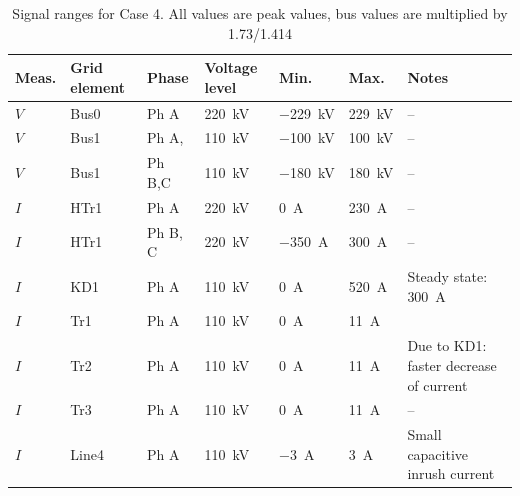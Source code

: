 
\begin{table}[htbp]
  \centering
  \caption{Signal ranges for Case 4. All values are peak values, bus values are multiplied by 1.73/1.414}
  \label{tab:measurement-values-case4}
  \small
  \setlength{\tabcolsep}{3.5pt}
  \renewcommand{\arraystretch}{1.18}
  \begin{tabularx}{\textwidth}{@{}
      >{\raggedright\arraybackslash}p{}
      >{\raggedright\arraybackslash}p{}
      >{\raggedright\arraybackslash}p{}
      >{\raggedright\arraybackslash}p{}
      >{\raggedright\arraybackslash}p{}
      >{\raggedright\arraybackslash}p{}
      Y@{}}
    \toprule
    \textbf{Meas.} &
    \textbf{Grid element} &
    \textbf{Phase} &
    \textbf{Voltage level} &
    \textbf{Min.} &
    \textbf{Max.} &
    \textbf{Notes} \\
    \midrule
    $V$ & Bus0  & Ph A       & \SI{220}{\kilo\volt} & \SI{-229}{\kilo\volt} & \SI{229}{\kilo\volt} & -- \\
    $V$ & Bus1  & Ph A,    & \SI{110}{\kilo\volt} & \SI{-100}{\kilo\volt} & \SI{100}{\kilo\volt} & -- \\
    $V$ & Bus1  & Ph B,C     & \SI{110}{\kilo\volt} & \SI{-180}{\kilo\volt} & \SI{180}{\kilo\volt} & -- \\
    $I$ & HTr1  & Ph A       & \SI{220}{\kilo\volt} & \SI{0}{\ampere} & \SI{230}{\ampere} & -- \\
    $I$ & HTr1  & Ph B, C    & \SI{220}{\kilo\volt} & \SI{-350}{\ampere} & \SI{300}{\ampere} & -- \\
    $I$ & KD1   & Ph A       & \SI{110}{\kilo\volt} & \SI{0}{\ampere} & \SI{520}{\ampere} & Steady state: \SI{300}{\ampere} \\
    $I$ & Tr1   & Ph A       & \SI{110}{\kilo\volt} & \SI{0}{\ampere} & \SI{11}{\ampere} & \\
    $I$ & Tr2   & Ph A       & \SI{110}{\kilo\volt} & \SI{0}{\ampere} & \SI{11}{\ampere} & Due to KD1: faster decrease of current \\
    $I$ & Tr3   & Ph A      & \SI{110}{\kilo\volt} & \SI{0}{\ampere} & \SI{11}{\ampere} & -- \\
    $I$ & Line4 & Ph A & \SI{110}{\kilo\volt} & \SI{-3}{\ampere} & \SI{3}{\ampere} & Small capacitive inrush current  \\

\end{tabularx}
\end{table}
